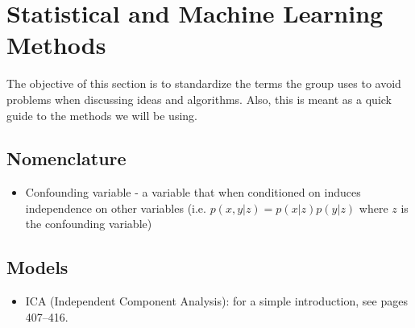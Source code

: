 \documentclass{article}
\begin{document}
\section{Statistical and Machine Learning Methods\label{sec:methods}}

The objective of this section is to standardize the terms the group uses to avoid problems when discussing ideas and algorithms. Also, this is meant as a quick guide to the methods we will be using.

\subsection{Nomenclature\label{sec:method-nomen}}
\begin{itemize}
\item Confounding variable - a variable that when conditioned on induces independence on other variables (i.e. $p(x,y|z) = p(x|z)p(y|z)$ where $z$ is the confounding variable)
\end{itemize}


\subsection{Models\label{models}}
\begin{itemize}
\item ICA (Independent Component Analysis): for a simple introduction, see \cite{Murphy2012} pages 407--416.
\end{itemize}



\end{document}
